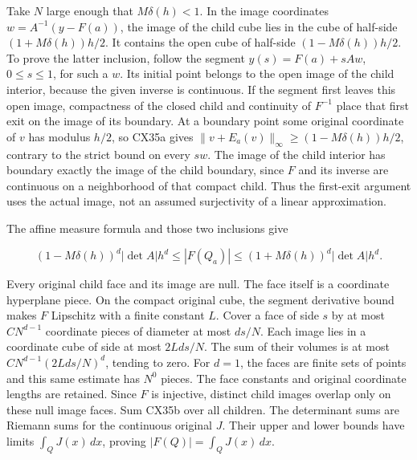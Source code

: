 \documentclass[
  11pt,
]{article}
\begin{document}
Take \(N\) large enough that \(M\delta(h)<1\). In the image coordinates
\(w=A^{-1}(y-F(a))\), the image of the child cube lies in the cube of
half-side \((1+M\delta(h))h/2\). It contains the open cube of half-side
\((1-M\delta(h))h/2\). To prove the latter inclusion, follow the segment
\(y(s)=F(a)+sAw\), \(0\leq s\leq1\), for such a \(w\). Its initial point
belongs to the open image of the child interior, because the given
inverse is continuous. If the segment first leaves this open image,
compactness of the closed child and continuity of \(F^{-1}\) place that
first exit on the image of its boundary. At a boundary point some
original coordinate of \(v\) has modulus \(h/2\), so CX35a gives
\(\|v+E_a(v)\|_\infty\geq(1-M\delta(h))h/2\), contrary to the strict
bound on every \(sw\). The image of the child interior has boundary
exactly the image of the child boundary, since \(F\) and its inverse are
continuous on a neighborhood of that compact child. Thus the first-exit
argument uses the actual image, not an assumed surjectivity of a linear
approximation.

The affine measure formula and those two inclusions give

\[
(1-M\delta(h))^d|\det A|h^d
 \leq |F(Q_a)|\leq
(1+M\delta(h))^d|\det A|h^d.
\tag{CX35b}
\]

Every original child face and its image are null. The face itself is a
coordinate hyperplane piece. On the compact original cube, the segment
derivative bound makes \(F\) Lipschitz with a finite constant \(L\).
Cover a face of side \(s\) by at most \(C N^{d-1}\) coordinate pieces of
diameter at most \(ds/N\). Each image lies in a coordinate cube of side
at most \(2Lds/N\). The sum of their volumes is at most
\(C N^{d-1}(2Lds/N)^d\), tending to zero. For \(d=1\), the faces are
finite sets of points and this same estimate has \(N^0\) pieces. The
face constants and original coordinate lengths are retained. Since \(F\)
is injective, distinct child images overlap only on these null image
faces. Sum CX35b over all children. The determinant sums are Riemann
sums for the continuous original \(J\). Their upper and lower bounds
have limits \(\int_QJ(x)\,dx\), proving \(|F(Q)|=\int_QJ(x)\,dx\).
\end{document}
